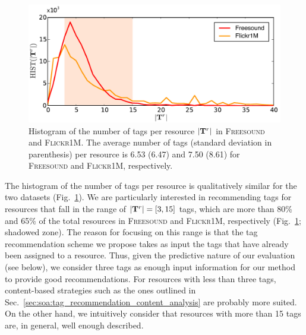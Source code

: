 \begin{figure}[t]
  \centerline{
  \includegraphics[width=\figSizeLarge]{ch03_general/pics/05_tag_distributions_B.pdf}}
  \caption[Histogram of the number of tags per resource in \textsc{Freesound} and \textsc{Flickr1M}]{Histogram of the number of tags per resource $|\mathbf{T}^r|$ in \textsc{Freesound} and \textsc{Flickr1M}. The average number of tags (standard deviation in parenthesis) per resource is 6.53 (6.47) and 7.50 (8.61) for \textsc{Freesound} and \textsc{Flickr1M}, respectively.}
  \label{general:fig:tag_distributions}
\end{figure}

The histogram of the number of tags per resource is qualitatively similar for the two datasets (Fig.~\ref{general:fig:tag_distributions}). We are particularly interested in recommending tags for resources that fall in the range of $|\mathbf{T}^r|=[3,15]$ tags, which are more than 80\% and 65\% of the total resources in \textsc{Freesound} and \textsc{Flickr1M}, respectively (Fig.~\ref{general:fig:tag_distributions}; shadowed zone). The reason for focusing on this range is that the tag recommendation scheme we propose takes as input the tags that have already been assigned to a resource. Thus, given the predictive nature of our evaluation (see below), we consider three tags as enough input information for our method to provide good recommendations. For resources with less than three tags, content-based strategies such as the ones outlined in Sec.~\ref{sec:soa:tag_recommendation_content_analysis} are probably more suited. On the other hand, we intuitively consider that resources with more than 15 tags are, in general, well enough described.

